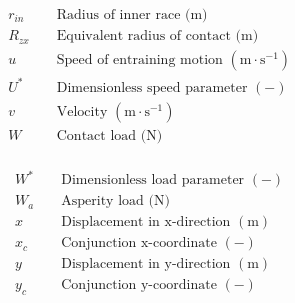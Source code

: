 \begin{align*}
	&r_{i n} && \text { Radius of inner race (m) } \\
	&R_{z x} && \text { Equivalent radius of contact (m) } \\
	&u && \text { Speed of entraining motion }\left(\mathrm{m} \cdot \mathrm{s}^{-1}\right) \\
	&U^* && \text { Dimensionless speed parameter }(-) \\
	&v && \text { Velocity }\left(\mathrm{m} \cdot \mathrm{s}^{-1}\right) \\
	&W && \text { Contact load (N) } \\
\end{align*}

\pagebreak

\begin{align*}
	&W^* && \text { Dimensionless load parameter }(-) \\
	&W_a && \text { Asperity load (N) } \\
	&x && \text { Displacement in x-direction }(\mathrm{m}) \\
	&x_c && \text { Conjunction x-coordinate }(-) \\
	&y && \text { Displacement in y-direction }(\mathrm{m}) \\
	&y_c && \text { Conjunction y-coordinate }(-) \\
\end{align*}
	
